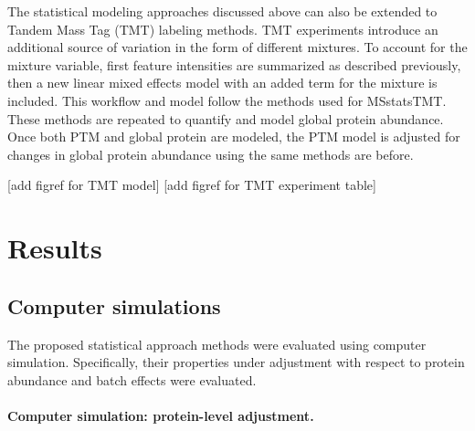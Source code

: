\documentclass[mcp]{article}
\numberwithin{figure}{section} %
\numberwithin{table}{section}
\def\todo#1{{\color{red}[#1]}}
\begin{document}
The statistical modeling approaches discussed above can also be extended to Tandem Mass Tag (TMT) labeling methods. TMT experiments introduce an additional source of variation in the form of different mixtures. To account for the mixture variable, first feature intensities are summarized as described previously, then a new linear mixed effects model with an added term for the mixture is included. This workflow and model follow the methods used for MSstatsTMT. \cite{Huang:2020} These methods are repeated to quantify and model global protein abundance. Once both PTM and global protein are modeled, the PTM model is adjusted for changes in global protein abundance using the same methods are before.

\todo{add figref for TMT model}
\todo{add figref for TMT experiment table}

\section{Results}

\subsection*{Computer simulations}

The proposed statistical approach methods were evaluated using computer simulation. Specifically, their properties under adjustment with respect to protein abundance and batch effects were evaluated.

\paragraph*{Computer simulation: protein-level adjustment.} 
\end{document}
